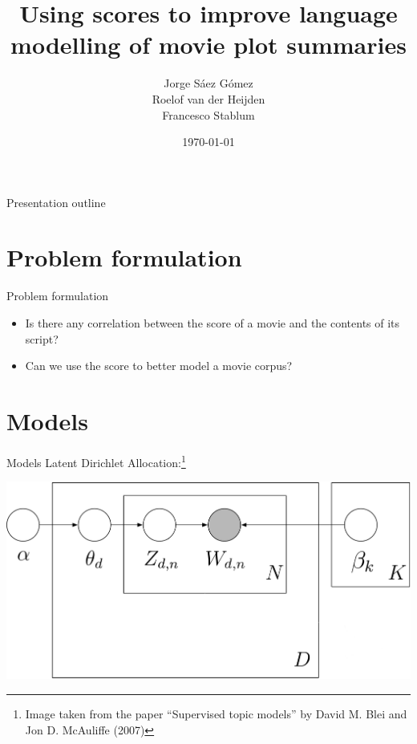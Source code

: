 \documentclass{beamer}
\title{Using scores to improve language modelling of movie plot summaries}
\author[J. Sáez Gómez, R. vd Heijden, F. Stablum]{Jorge Sáez Gómez\\Roelof van der Heijden\\Francesco Stablum}
\institute{Universiteit van Amsterdam}
\date{\today}
\begin{document}
\begin{frame}
	\maketitle
\end{frame}

\begin{frame}{Presentation outline}
	\tableofcontents
\end{frame}

\section{Problem formulation}

\begin{frame}{Problem formulation}
	\begin{itemize}
	\item Is there any correlation between the score of a movie and the contents of its script?
	\item Can we use the score to better model a movie corpus?
	\end{itemize}
\end{frame}

\section{Models}

\begin{frame}{Models}
	Latent Dirichlet Allocation:\footnote{\tiny{}Image taken from the paper ``Supervised topic models'' by David M. Blei and Jon D. McAuliffe (2007)}

	\includegraphics[width=\textwidth]{LDA.png}
\end{frame}
\end{document}
